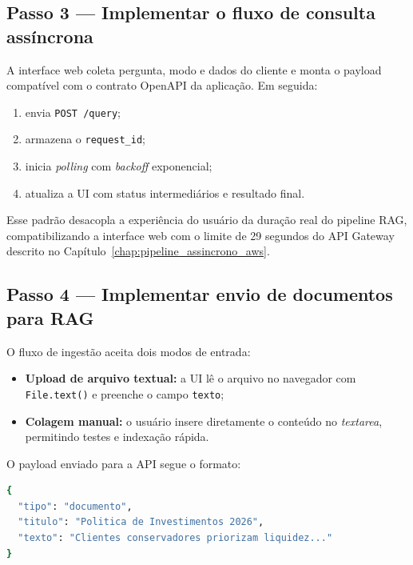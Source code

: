\subsection{Passo 3 --- Implementar o fluxo de consulta ass\'incrona}

A interface web coleta pergunta, modo e dados do cliente e monta o payload
compat\'ivel com o contrato OpenAPI da aplica\c{c}\~ao. Em seguida:

\begin{enumerate}[leftmargin=*]
  \item envia \texttt{POST /query};
  \item armazena o \texttt{request\_id};
  \item inicia \textit{polling} com \textit{backoff} exponencial;
  \item atualiza a UI com status intermedi\'arios e resultado final.
\end{enumerate}

Esse padr\~ao desacopla a experi\^encia do usu\'ario da dura\c{c}\~ao real do
pipeline RAG, compatibilizando a interface web com o limite de 29 segundos
do API Gateway descrito no Cap\'itulo~\ref{chap:pipeline_assincrono_aws}.

\subsection{Passo 4 --- Implementar envio de documentos para RAG}

O fluxo de ingest\~ao aceita dois modos de entrada:

\begin{itemize}[leftmargin=*]
  \item \textbf{Upload de arquivo textual:} a UI l\^e o arquivo no navegador
        com \texttt{File.text()} e preenche o campo \texttt{texto};
  \item \textbf{Colagem manual:} o usu\'ario insere diretamente o conte\'udo
        no \textit{textarea}, permitindo testes e indexa\c{c}\~ao r\'apida.
\end{itemize}

O payload enviado para a API segue o formato:

\begin{lstlisting}[language=bash,
  caption={Payload de ingest\~ao de documento no RAG.},
  label={lst:payload_documento_rag}]
{
  "tipo": "documento",
  "titulo": "Politica de Investimentos 2026",
  "texto": "Clientes conservadores priorizam liquidez..."
}
\end{lstlisting}

